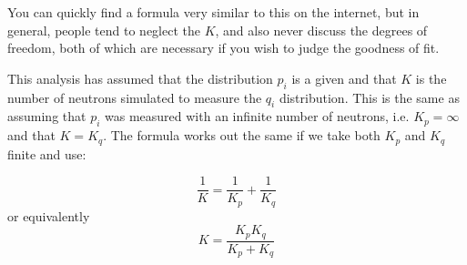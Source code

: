\documentclass[letterpaper,12pt]{article}
\begin{document}
You can quickly find a formula very similar to this on the internet, but in general, people tend to neglect the $K$, and also never discuss the degrees of freedom, both of which are necessary if you wish to judge the goodness of fit.

This analysis has assumed that the distribution $p_i$ is a given and that $K$ is the number of neutrons simulated to measure the $q_i$ distribution. This is the same as assuming that $p_i$ was measured with an infinite number of neutrons, i.e. $K_p=\infty$ and that $K=K_q$. The formula works out the same if we take both $K_p$ and $K_q$ finite and use:

\begin{equation}
	\frac{1}{K}=\frac{1}{K_p}+\frac{1}{K_q}
\end{equation}
or equivalently
\begin{equation}
	K=\frac{K_pK_q}{K_p+K_q}
\end{equation}
\end{document}

